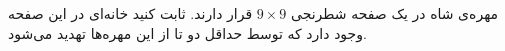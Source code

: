        مهره‌ی شاه در یک صفحه شطرنجی 
       $9\times9$
       قرار دارند. ثابت کنید خانه‌ای در این صفحه وجود دارد که توسط حداقل دو تا از این مهره‌ها تهدید می‌شود.
